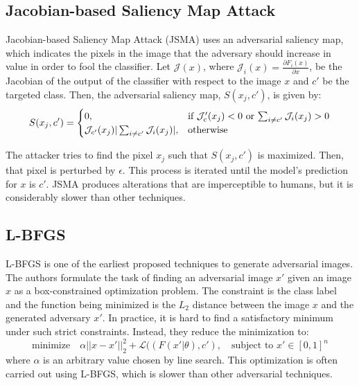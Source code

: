 \subsection{Jacobian-based Saliency Map Attack}
Jacobian-based Saliency Map Attack (JSMA) \cite{Carlini2017TowardsET} uses an adversarial saliency map, which indicates the pixels in the image that the adversary should increase in value in order to fool the classifier.
Let $\mathcal{J}(x)$, where  $\mathcal{J}_i(x) = \frac{\partial F_{i}(x)}{\partial x} $, be the Jacobian of the output of the classifier with respect to the image $x$ and $c'$ be the targeted class.
Then, the adversarial saliency map, $S(x_j,c')$, is given by: 
\[
 S(x_j,c') = \begin{cases} 
            0, & \text{if $\mathcal{J}_c'(x_j)<0$}$ or $\sum_{i \neq c'} \mathcal{J}_i(x_j) > 0 \\
           \mathcal{J}_{c'}(x_j) | \sum_{i \neq c'} \mathcal{J}_i(x_j) |, & \text{otherwise}
          \end{cases}
\]

The attacker tries to find the pixel {$x_j$} such that $S(x_j,c')$ is maximized. 
Then, that pixel is perturbed by $\epsilon$. 
This process is iterated until the model's prediction for $x$ is $c'$. 
JSMA produces alterations that are imperceptible to humans, but it is considerably slower than other techniques.

\subsection{L-BFGS}
L-BFGS \cite{Szegedy2013IntriguingPO} is one of the earliest proposed techniques to generate adversarial images.
The authors formulate the task of finding an adversarial image $x'$ given an image $x$ as a box-constrained optimization problem.
The constraint is the class label and the function being minimized is the $L_2$ distance between the image $x$ and the generated adversary $x'$.
In practice, it is hard to find a satisfactory minimum under such strict constraints. Instead, they reduce the minimization to:
\[
\text{minimize} \quad \alpha || x - x' ||_2^2 + \mathcal{L}((F(x'|\theta),c'),\quad \text{subject to } x' \in [0,1]^n 
\]
where $\alpha$ is an arbitrary value chosen by line search. 
This optimization is often carried out using L-BFGS, which is slower than other adversarial techniques.

